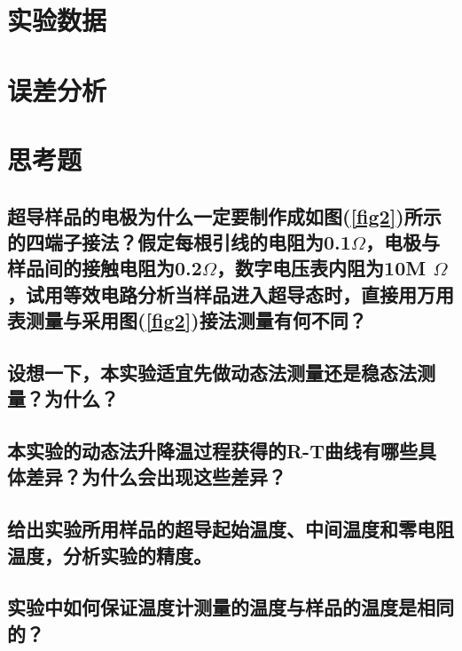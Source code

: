 \documentclass[a4paper]{article}
\begin{document}
\section{实验数据}

\section{误差分析}

\section{思考题}
\subsection{超导样品的电极为什么一定要制作成如图(\ref{fig2})所示的四端子接法？假定每根引线的电阻为0.1$\Omega$，电极与样品间的接触电阻为0.2$\Omega$，数字电压表内阻为10M $\Omega$，试用等效电路分析当样品进入超导态时，直接用万用表测量与采用图(\ref{fig2})接法测量有何不同？}
\subsection{设想一下，本实验适宜先做动态法测量还是稳态法测量？为什么？}
\subsection{本实验的动态法升降温过程获得的R-T曲线有哪些具体差异？为什么会出现这些差异？}
\subsection{给出实验所用样品的超导起始温度、中间温度和零电阻温度，分析实验的精度。}
\subsection{实验中如何保证温度计测量的温度与样品的温度是相同的？}

\nocite{jiaocai}

\end{document}
